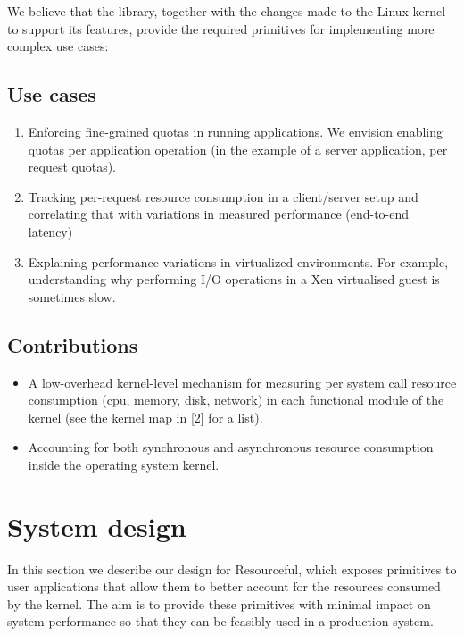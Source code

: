 \documentclass[12pt]{article}
\begin{document}
We believe that the library, together with the changes made to the Linux kernel to support its features, provide the required primitives for implementing more complex use cases:

\subsection{Use cases}
\begin{enumerate}
\item Enforcing fine-grained quotas in running applications. We envision enabling quotas per application operation (in the example of a server application, per request quotas).
\item Tracking per-request resource consumption in a client/server setup and correlating that with variations in measured performance (end-to-end latency)
\item Explaining performance variations in virtualized environments. For example, understanding why performing I/O operations in a Xen virtualised guest is sometimes slow.
\end{enumerate}


\subsection{Contributions}
\begin{itemize}
\item A low-overhead kernel-level mechanism for measuring per system call resource consumption (cpu, memory, disk, network) in each functional module of the kernel (see the kernel map in [2] for a list).
\item Accounting for both synchronous and asynchronous resource consumption inside the operating system kernel.
\end{itemize}


\section{System design}
In this section we describe our design for Resourceful, which exposes primitives to user applications that allow them to better account for the resources consumed by the kernel.
The aim is to provide these primitives with minimal impact on system performance so that they can be feasibly used in a production system.
\end{document}
